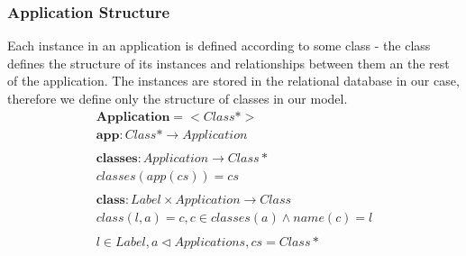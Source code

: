 \documentclass[11pt]{article}
\begin{document}
\subsubsection{Application Structure}
Each instance in an application is defined according to some class - the class defines the structure of its instances and relationships between them an the rest of the application. The instances are stored in the relational database in our case, therefore we define only the structure of classes in our model. 
\begin{align*}
  \mathbf{Application} = < Class* > \\ 
  \mathbf{app} : Class* \rightarrow  Application \\ \\
  \mathbf{classes} : Application \rightarrow Class* \\
  classes(app(cs)) = cs  \\\\
  \mathbf{class} : Label \times Application \rightarrow Class   \\ 
  class(l, a) = c, c \in classes(a) \wedge name(c) = l \\ \\
  l \in Label,a \lhd Applications, cs = Class* 
\end{align*}
\end{document}
